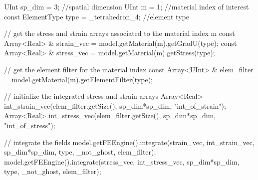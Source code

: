 \begin{cpp}
UInt sp_dim = 3; //spatial dimension
UInt m = 1; //material index of interest
const ElementType type = _tetrahedron_4; //element type

// get the stress and strain arrays associated to the material index m
const Array<Real> & strain_vec = model.getMaterial(m).getGradU(type);
const Array<Real> & stress_vec = model.getMaterial(m).getStress(type);

// get the element filter for the material index
const Array<UInt> & elem_filter = model.getMaterial(m).getElementFilter(type);

// initialize the integrated stress and strain arrays
Array<Real> int_strain_vec(elem_filter.getSize(), 
                           sp_dim*sp_dim, "int_of_strain");
Array<Real> int_stress_vec(elem_filter.getSize(), 
                           sp_dim*sp_dim, "int_of_stress");

// integrate the fields      
model.getFEEngine().integrate(strain_vec, int_strain_vec, 
                              sp_dim*sp_dim, type, _not_ghost, elem_filter);
model.getFEEngine().integrate(stress_vec, int_stress_vec, 
                              sp_dim*sp_dim, type, _not_ghost, elem_filter);
\end{cpp}


